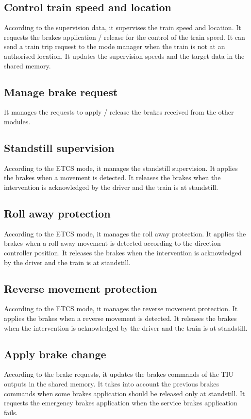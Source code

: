 \documentclass[nocc]{template/openetcs_report}
\begin{document}
\subsection{Control train speed and location}
According to the supervision data, it supervises the train speed and location. 
It requests the brakes application / release for the control of the train speed. 
It can send a train trip request to the mode manager when the train is not at an authorised location.
It updates the supervision speeds and the target data in the shared memory.

\subsection{Manage brake request}
It manages the requests to apply / release the brakes received from the other modules.

\subsection{Standstill supervision}
According to the ETCS mode, it manages the standstill supervision.
It applies the brakes when a movement is detected. It releases the brakes when the intervention is acknowledged by the driver and the train is at standstill.

\subsection{Roll away protection}
According to the ETCS mode, it manages the roll away protection. 
It applies the brakes when a roll away movement is detected according to the direction controller position. It releases the brakes when the intervention is acknowledged by the driver and the train is at standstill.

\subsection{Reverse movement protection}
According to the ETCS mode, it manages the reverse movement protection. 
It applies the brakes when a reverse movement is detected. It releases the brakes when the intervention is acknowledged by the driver and the train is at standstill.

\subsection{Apply brake change}
According to the brake requests, it updates the brakes commands of the TIU outputs in the shared memory. 
It takes into account the previous brakes commands when some brakes application should be released only at standstill.
It requests the emergency brakes application when the service brakes application fails.
\end{document}
